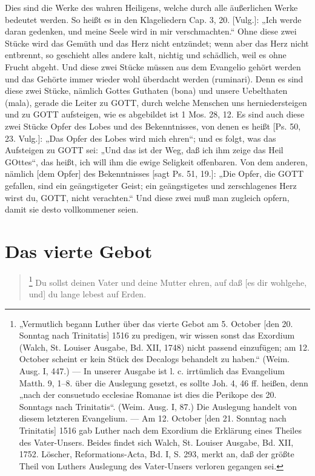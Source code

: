 Dies sind die Werke des wahren Heiligens, welche durch alle äußerlichen Werke bedeutet werden. So heißt es in den Klageliedern Cap. 3, 20. [Vulg.]: „Ich werde daran gedenken, und meine Seele wird in mir verschmachten.“ Ohne diese zwei Stücke wird das Gemüth und das Herz nicht entzündet; wenn aber das Herz nicht entbrennt, so geschieht alles andere kalt, nichtig und schädlich, weil es ohne Frucht abgeht. Und diese zwei Stücke müssen aus dem Evangelio gehört werden und das Gehörte immer wieder wohl überdacht werden (ruminari). Denn es sind diese zwei Stücke, nämlich Gottes Guthaten (bona) und unsere Uebelthaten (mala), gerade die Leiter zu GOTT, durch welche Menschen uns herniedersteigen und zu GOTT aufsteigen, wie es abgebildet ist 1 Mos. 28, 12. Es sind auch diese zwei Stücke Opfer des Lobes und des Bekenntnisses, von denen es heißt [Ps. 50, 23. Vulg.]: „Das Opfer des Lobes wird mich ehren“; und es folgt, was das Aufsteigen zu GOTT sei: „Und das ist der Weg, daß ich ihm zeige das Heil GOttes“, das heißt, ich will ihm die ewige Seligkeit offenbaren. Von dem anderen, nämlich [dem Opfer] des Bekenntnisses [sagt Ps. 51, 19.]: „Die Opfer, die GOTT gefallen, sind ein geängstigeter Geist; ein geängstigetes und zerschlagenes Herz wirst du, GOTT, nicht verachten.“ Und diese zwei muß man zugleich opfern, damit sie desto vollkommener seien.

\section{Das vierte Gebot}

\begin{quote}
\footnote{„Vermutlich begann Luther über das vierte Gebot am 5. October [den 20. Sonntag nach Trinitatis] 1516 zu predigen, wir wissen sonst das Exordium (Walch, St. Louiser Ausgabe, Bd. XII, 1748) nicht passend einzufügen; am 12. October scheint er kein Stück des Decalogs behandelt zu haben.“ (Weim. Ausg. I, 447.) — In unserer Ausgabe ist l. c. irrtümlich das Evangelium Matth. 9, 1–8. über die Auslegung gesetzt, es sollte Joh. 4, 46 ff. heißen, denn „nach der consuetudo ecclesiae Romanae ist dies die Perikope des 20. Sonntags nach Trinitatis“. (Weim. Ausg. I, 87.) Die Auslegung handelt von diesem letzteren Evangelium. — Am 12. October [den 21. Sonntag nach Trinitatis] 1516 gab Luther nach dem Exordium die Erklärung eines Theiles des Vater-Unsers. Beides findet sich Walch, St. Louiser Ausgabe, Bd. XII, 1752. Löscher, Reformations-Acta, Bd. I, S. 293, merkt an, daß der größte Theil von Luthers Auslegung des Vater-Unsers verloren gegangen sei.} Du sollst deinen Vater und deine Mutter ehren, auf daß [es dir wohlgehe, und] du lange lebest auf Erden.
\end{quote}

